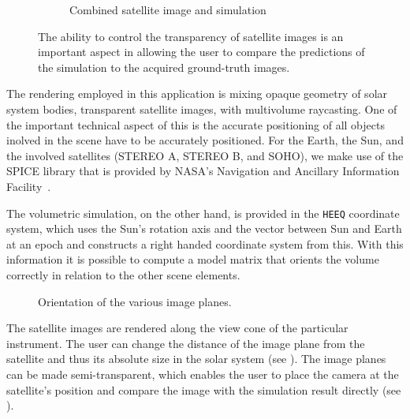\begin{figure}
\begin{subfigure}[b]{0.32\textwidth}
    \caption{Combined satellite image and simulation}
    \label{contributions:astro:spaceweather:velocity:coronagraph:coronagraph_simulation}
\end{subfigure}
\caption{The ability to control the transparency of satellite images is an important aspect in allowing the user to compare the predictions of the simulation to the acquired ground-truth images.}
\label{contributions:astro:spaceweather:rendering:coronagraph}
\end{figure}

The rendering employed in this application is mixing opaque geometry of solar system bodies, transparent satellite images, with multivolume raycasting.  One of the important technical aspect of this is the accurate positioning of all objects inolved in the scene have to be accurately positioned.  For the Earth, the Sun, and the involved satellites (STEREO A, STEREO B, and SOHO), we make use of the SPICE library that is provided by NASA's Navigation and Ancillary Information Facility~\cite{acton1996ancillary}.

The volumetric simulation, on the other hand, is provided in the \texttt{HEEQ} coordinate system, which uses the Sun's rotation axis and the vector between Sun and Earth at an epoch and constructs a right handed coordinate system from this.  With this information it is possible to compute a model matrix that orients the volume correctly in relation to the other scene elements.

\begin{figure}
\centering
{}
\caption{Orientation of the various image planes.}
\label{contributions:astro:spacewather:rendering:planes}
\end{figure}

The satellite images are rendered along the view cone of the particular instrument.  The user can change the distance of the image plane from the satellite and thus its absolute size in the solar system (see ).  The image planes can be made semi-transparent, which enables the user to place the camera at the satellite's position and compare the image with the simulation result directly (see ).

